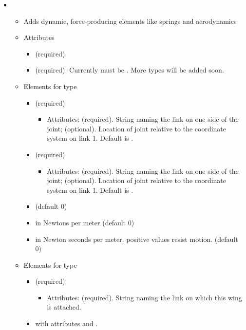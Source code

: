 \begin{itemize}
\item {}
\begin{itemize}
\item Adds dynamic, force-producing elements like springs and
  aerodynamics
\item Attributes
\begin{itemize}
\item {} (required).
\item {} (required).  Currently must be
  .  More types will be added soon.
\end{itemize}
\item Elements for type 
\begin{itemize}
\item {} (required)  
\begin{itemize}
\item Attributes:  (required). String naming the link on
  one side of the joint;  (optional). Location of joint relative to the coordinate system on link 1. Default is .
\end{itemize}
\item {} (required)
\begin{itemize}
\item Attributes:  (required). String naming the link on
  one side of the joint;  (optional). Location of joint relative to the coordinate system on link 1. Default is .
\end{itemize}
\item {} (default 0)
\item {} in Newtons per meter (default 0)
\item {} in Newton seconds per meter.  positive values
  resist motion.  (default 0)
\end{itemize}
\item Elements for type 
\begin{itemize}
\item {} (required). 
\begin{itemize} 
\item Attributes:  (required).  String naming
  the link on which this wing is attached.
\end{itemize}
\item {} with attributes  and .

\end{itemize}
\end{itemize}
\end{itemize}
